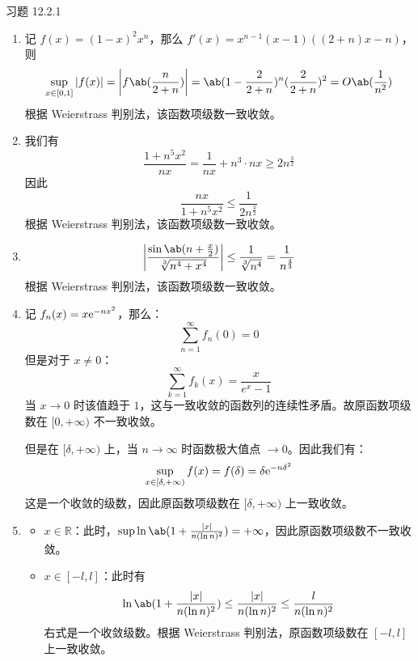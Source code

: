 \begin{problem}
    习题 12.2.1
    \begin{solution}
        \begin{enumerate}
            \item[\textbf{1)}] 记 $f(x) = (1 - x)^2 x^{n}$，那么 $f'(x) = x^{n - 1} (x - 1) ((2 + n) x - n)$，则
            $$
            \sup_{x \in [0, 1]} \abs{f(x)} = \abs{f\ab(\frac{n}{2 + n})} = \ab(1 - \frac{2}{2 + n})^{n} (\frac{2}{2 + n})^2 = O\ab(\frac{1}{n^2})
            $$
            根据 Weierstrass 判别法，该函数项级数一致收敛。

            \item[\textbf{3)}] 我们有
            $$
            \frac{1 + n^{5} x^2}{n x} = \frac{1}{n x} + n^{3} \cdot n x \ge 2 n^{\frac{3}{2}}
            $$
            因此
            $$
            \frac{n x}{1 + n^{5} x^2} \le \frac{1}{2 n^{\frac{3}{2}}}
            $$
            根据 Weierstrass 判别法，该函数项级数一致收敛。

            \item[\textbf{5)}]
            $$
            \abs{\frac{\sin \ab(n + \frac{x}{2})}{\sqrt[3]{n^{4} + x^{4}}}} \le \frac{1}{\sqrt[3]{n^{4}}} = \frac{1}{n^{\frac{4}{3}}}
            $$
            根据 Weierstrass 判别法，该函数项级数一致收敛。

            \item[\textbf{7)}] 记 $f_n(x) = x \mathrm{e}^{-n x^2}$，那么：
            $$
            \sum_{n = 1}^{\infty} f_n(0) = 0
            $$
            但是对于 $x \neq 0$：
            $$
            \sum_{k = 1}^{\infty} f_k(x) = \frac{x}{e^{x} - 1}
            $$
            当 $x \to 0$ 时该值趋于 $1$，这与一致收敛的函数列的连续性矛盾。故原函数项级数在 $[0, + \infty)$ 不一致收敛。

            但是在 $[\delta, + \infty)$ 上，当 $n \to \infty$ 时函数极大值点 $\to 0$。因此我们有：
            $$
            \sup_{x \in [\delta, + \infty)} f(x) = f(\delta) = \delta \mathrm{e}^{-n \delta^2}
            $$
            这是一个收敛的级数，因此原函数项级数在 $[\delta, + \infty)$ 上一致收敛。

            \item[\textbf{9)}]
            \begin{itemize}
                \item $x \in \mathbb{R}$：此时，$\sup \ln\ab(1 + \frac{\abs{x}}{n (\ln n)^2}) = +\infty$，因此原函数项级数不一致收敛。
                \item $x \in [-l, l]$：此时有
                $$
                \ln \ab(1 + \frac{\abs{x}}{n (\ln n)^2}) \le \frac{\abs{x}}{n (\ln n)^2} \le \frac{l}{n (\ln n)^2}
                $$
                右式是一个收敛级数。根据 Weierstrass 判别法，原函数项级数在 $[-l, l]$ 上一致收敛。
            \end{itemize}
        \end{enumerate}
    \end{solution}
\end{problem}

